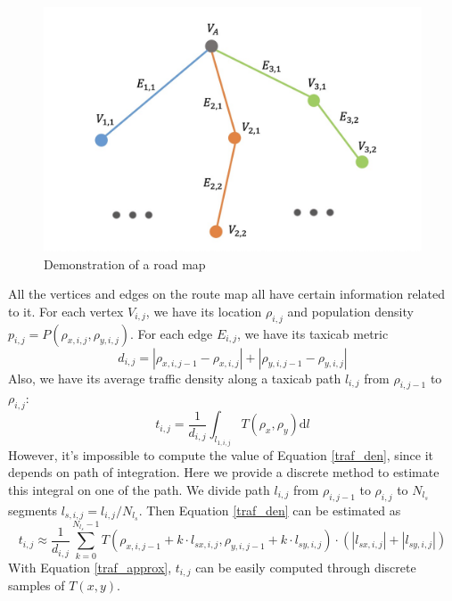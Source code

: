 \documentclass{mcmthesis}
\begin{document}
\begin{figure}[htbp]
	\centering
	\includegraphics[width=14cm]{figures/routedemo.jpg}
	\caption{Demonstration of a road map}
    \label{roadmap_demo}
\end{figure}

All the vertices and edges on the route map all have certain information related to it. For each vertex $V_{i, j}$, we have its location $\rho_{i, j}$ and population density $p_{i, j} = P(\rho_{x,i,j}, \rho_{y,i,j})$. For each edge $E_{i, j}$, we have its taxicab metric \cite{ManhatDist}
\begin{equation}
d_{i,j} = |\rho_{x,i,j-1} - \rho_{x,i,j}| + |\rho_{y,i,j-1} - \rho_{y,i,j}| 
\end{equation}
Also, we have its average traffic density along a taxicab path $l_{i,j}$ from $\rho_{i,j-1}$ to $\rho_{i, j}$:
\begin{equation}
t_{i,j} = \frac{1}{d_{i,j}}\int_{l_{1,i,j}} T(\rho_{x}, \rho_{y})\mathrm{d}l
\label{traf_den}
\end{equation}
However, it's impossible to compute the value of Equation \ref{traf_den}, since it depends on path of integration. Here we provide a discrete method to estimate this integral on one of the path. We divide path $l_{i,j}$ from $\rho_{i,j-1}$ to $\rho_{i, j}$ to $N_{l_s}$ segments $l_{s, i, j} = l_{i,j}/N_{l_s}$. Then Equation \ref{traf_den} can be estimated as
\begin{equation}
t_{i,j} \approx \frac{1}{d_{i,j}}\sum\limits_{k=0}^{N_{l_s}-1} T(\rho_{x,i,j-1}+k\cdot l_{sx,i,j}, \rho_{y,i,j-1}+k\cdot l_{sy,i,j}) \cdot (|l_{sx,i,j}|+|l_{sy,i,j}|)
\label{traf_approx}
\end{equation}
With Equation \ref{traf_approx}, $t_{i,j}$ can be easily computed through discrete samples of $T(x,y)$. 
\end{document}
